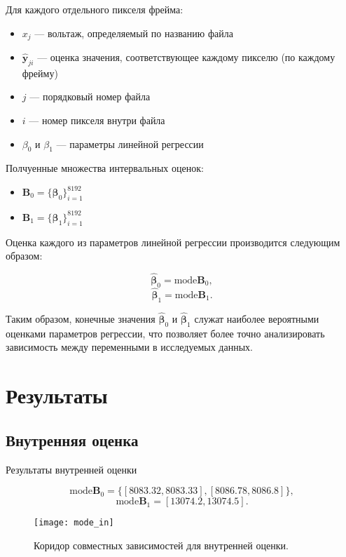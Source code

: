 \documentclass[a4paper,14pt]{article}
\begin{document}
  Для каждого отдельного пикселя фрейма:
  \begin{itemize}
    \item \( x_j \) --- вольтаж, определяемый по названию файла
    \item \( \hat{\mathbf{y}}_{ji} \) --- оценка значения, соответствующее каждому пикселю (по каждому фрейму)
    \item \( j \) --- порядковый номер файла
    \item  \( i \) --- номер пикселя внутри файла
    \item \( \beta_0 \) и \( \beta_1 \) --- параметры линейной регрессии
  \end{itemize}

  Полчуенные множества интервальных оценок:
  \begin{itemize}
    \item \( \mathbf{B}_0 = \{ \mathbf{\beta}_0 \}_{i=1}^{8192} \)
    \item \( \mathbf{B}_1 = \{ \mathbf{\beta}_1 \}_{i=1}^{8192} \)
  \end{itemize}

  Оценка каждого
  из параметров линейной регрессии производится следующим образом:

  \[ \hat{\mathbf{\beta}}_0 = \text{mode} \mathbf{B}_0, \]
  \[ \hat{\mathbf{\beta}}_1 = \text{mode} \mathbf{B}_1. \]

  Таким образом, конечные значения \( \hat{\mathbf{\beta}}_0 \) и
  \( \hat{\mathbf{\beta}}_1 \) служат наиболее вероятными оценками
  параметров регрессии, что позволяет более точно анализировать
  зависимость между переменными в исследуемых данных.

  \section{Результаты}

  \subsection{Внутренняя оценка}

  Результаты внутренней оценки

  \[
    \text{mode} \mathbf{B}_0
      = \{ [8083.32, 8083.33], [8086.78, 8086.8] \},
  \]
  \[
    \text{mode} \mathbf{B}_1 = [13074.2, 13074.5].
  \]

    \begin{figure}[H]
        \begin{center}
            \texttt{[image: mode\_in]}
            \caption{Коридор совместных зависимостей для внутренней оценки.}
    \label{figure:int_est}
        \end{center}
    \end{figure}
\end{document}
